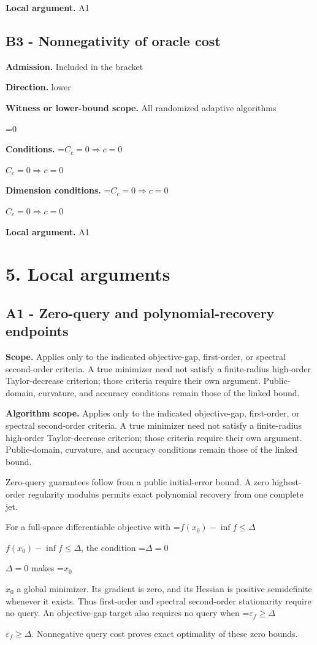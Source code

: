 \documentclass[10pt,a4paper]{article}
\newcommand{\AtlasMath}[1]{\par\begingroup\centering\setbox0=\hbox{$\displaystyle #1$}\ifdim\wd0>1.4\linewidth\typeout{ATLAS WIDE FORMULA: \the\wd0}\fi\ifdim\wd0>\linewidth\resizebox{\linewidth}{!}{\box0}\else\box0\fi\par\endgroup}
\newcommand{\AtlasInlineMath}[1]{\begingroup\setbox0=\hbox{$#1$}\ifdim\wd0>.4\linewidth\endgroup\AtlasMath{#1}\else\endgroup$#1$\fi}
\begin{document}
\textbf{Local argument.} A1

\subsection{B3 - Nonnegativity of oracle cost}
\textbf{Admission.} Included in the bracket

\textbf{Direction.} lower

\textbf{Witness or lower-bound scope.} All randomized adaptive algorithms

\AtlasMath{0}
\textbf{Conditions.} \AtlasInlineMath{C_c=0\Rightarrow c=0}

\textbf{Dimension conditions.} \AtlasInlineMath{C_c=0\Rightarrow c=0}

\textbf{Local argument.} A1

\section{5. Local arguments}
\subsection{A1 - Zero-query and polynomial-recovery endpoints}
\textbf{Scope.} Applies only to the indicated objective-gap, first-order, or spectral second-order criteria. A true minimizer need not satisfy a finite-radius high-order Taylor-decrease criterion; those criteria require their own argument. Public-domain, curvature, and accuracy conditions remain those of the linked bound.

\textbf{Algorithm scope.} Applies only to the indicated objective-gap, first-order, or spectral second-order criteria. A true minimizer need not satisfy a finite-radius high-order Taylor-decrease criterion; those criteria require their own argument. Public-domain, curvature, and accuracy conditions remain those of the linked bound.

Zero-query guarantees follow from a public initial-error bound. A zero highest-order regularity modulus permits exact polynomial recovery from one complete jet.

For a full-space differentiable objective with \AtlasInlineMath{f(x_0)-\inf f\le\Delta}, the condition \AtlasInlineMath{\Delta=0} makes \AtlasInlineMath{x_0} a global minimizer. Its gradient is zero, and its Hessian is positive semidefinite whenever it exists. Thus first-order and spectral second-order stationarity require no query. An objective-gap target also requires no query when \AtlasInlineMath{\varepsilon_f\ge\Delta}. Nonnegative query cost proves exact optimality of these zero bounds.
\end{document}
